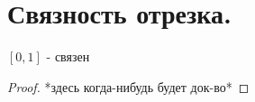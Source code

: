 \documentclass[geometry.tex]{subfiles}
\begin{document}
  \section{Связность отрезка.}

  \begin{theorem}
    $[0,1]$ - связен
  \end{theorem}

  \begin{proof}
    *здесь когда-нибудь будет док-во*
  \end{proof}
\end{document}
